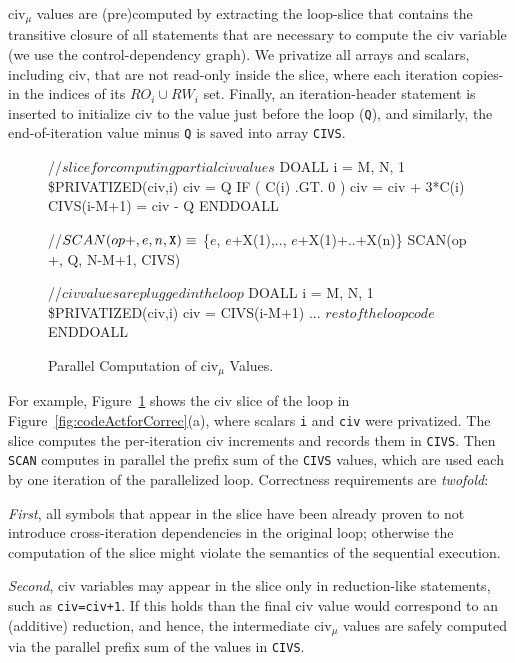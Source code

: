 \documentclass[10pt,nocopyrightspace]{sigplanconf}
\newcommand{\mymath}[1]{$ #1 $}
\begin{document}
{\sc civ}$_\mu$ values are (pre)computed by extracting the loop-slice
that contains the transitive closure of all statements 
that are necessary to compute the {\sc civ} variable
(we use the control-dependency graph). 
We privatize all arrays and scalars, including {\sc civ}, that are not 
read-only inside the slice, where each iteration copies-in the  indices 
of its $RO_i \cup RW_i$ set. Finally, an iteration-header statement is 
inserted to initialize {\sc civ} to the value just before the loop ({\tt Q}), 
and similarly, the end-of-iteration value minus {\tt Q} is saved into array 
{\tt CIVS}.  


\begin{figure}
\begin{colorcode}
//\mymath{slice for computing partial civ values}
DOALL i = M, N, 1      \$PRIVATIZED(civ,i)
  civ = Q
  IF ( C(i) .GT. 0 ) civ = civ + 3*C(i)
  CIVS(i-M+1) = civ - Q
ENDDOALL

//\mymath{SCAN(op {\tt{}+}, e, n, {\tt{}X}) \equiv} \{\mymath{e}, \mymath{e}+X(1),.., \mymath{e}+X(1)+..+X(n)\}
SCAN(op +, Q, N-M+1, CIVS)

//\mymath{civ values are plugged in the loop} 
DOALL i = M, N, 1      \$PRIVATIZED(civ,i)
  civ = CIVS(i-M+1)
  ... \mymath{rest of the loop code} 
ENDDOALL
\end{colorcode}
\vspace{-1ex}
\caption{ Parallel Computation of {\sc civ}$_\mu$ Values.}
\label{fig:CivSlice} %
\end{figure}

For example, Figure~\ref{fig:CivSlice} shows the {\sc civ} slice of the loop
in Figure~\ref{fig:codeActforCorrec}(a), where scalars {\tt i} and {\tt civ}
were privatized. The slice computes the per-iteration {\sc civ} increments 
and records them in {\tt CIVS}. Then {\tt SCAN}
computes in parallel the prefix sum of the {\tt CIVS} values, 
which are used each by one iteration of the parallelized loop.
%
Correctness requirements are {\em twofold}:  

{\em First}, all symbols that appear in the slice have been already proven 
to not introduce cross-iteration dependencies in the original loop; otherwise 
the computation of the slice might violate the semantics of the sequential execution. 

{\em Second}, {\sc civ} variables may appear in the slice only in reduction-like statements, 
such as {\tt civ=civ+1}.
If this holds than the final {\sc civ} value would correspond to an (additive) reduction, 
and hence, the intermediate {\sc civ}$_\mu$ values are safely computed via the parallel 
prefix sum of the values in {\tt CIVS}. 
\end{document}
